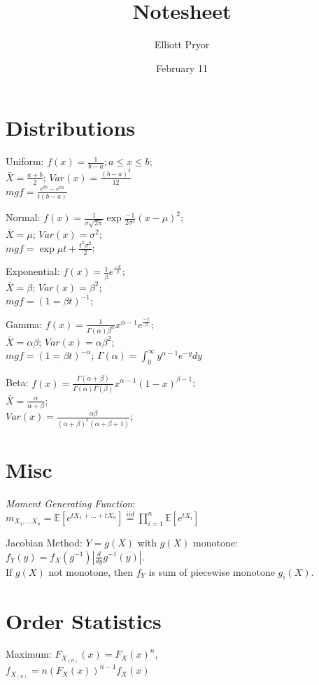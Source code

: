 \documentclass[10pt]{article}
\title{Notesheet}
\author{Elliott Pryor}
\date{February 11}
\begin{document}


\section{Distributions}
Uniform: $f(x) = \frac{1}{b - a}; a \leq x \leq b$;\\
$\bar{X} = \frac{a + b}{2}$;
$Var(x) = \frac{(b-a)^2}{12}$\\
$mgf = \frac{e^{tb} - e^{ta}}{t(b - a)}$

Normal: $f(x) = \frac{1}{\sigma \sqrt{2 \pi}} \exp{\frac{-1}{2\sigma^2}(x - \mu)^2}$;\\
$\bar{X} = \mu$;
$Var(x) = \sigma^2$;\\
$mgf = \exp{\mu t + \frac{t^2 \sigma^2}{2}}$;

Exponential: $f(x) = \frac{1}{\beta} e^{\frac{-x}{\beta}}$;\\
$\bar{X} = \beta$;
$Var(x) = \beta^2$;\\
$mgf = (1 = \beta t)^{-1}$;

Gamma: $f(x) = \frac{1}{\Gamma(\alpha)\beta^\alpha} x^{\alpha - 1} e^{\frac{-x}{\beta}}$;\\
$\bar{X} = \alpha \beta$;
$Var(x) = \alpha \beta^2$;\\
$mgf = (1 = \beta t)^{-\alpha}$;
$\Gamma(\alpha) = \int_0^\infty y^{\alpha - 1}e^{-y}dy$

Beta: $f(x) = \frac{\Gamma(\alpha + \beta)}{\Gamma(\alpha) \Gamma(\beta)} x^{\alpha-1} (1 - x)^{\beta - 1}$;\\
$\bar{X} = \frac{\alpha}{\alpha + \beta}$;\\
$Var(x) = \frac{\alpha \beta}{(\alpha + \beta)^2(\alpha + \beta + 1)}$;


\section{Misc}
\emph{Moment Generating Function}:\\
$m_{X_1, \dots X_n} = \mathbb{E}[e^{tX_1 + \dots + tX_n}] \stackrel{iid}{=} \prod_{i=1}^n \mathbb{E}[e^{tX_i}]$

Jacobian Method: $Y = g(X)$ with $g(X)$ monotone:\\
$f_Y(y) = f_X(g^{-1}) \left| \frac{d}{dy} g^{-1}(y) \right|$.\\
If $g(X)$ not monotone, then $f_Y$ is sum of piecewise monotone $g_i(X)$.

\section{Order Statistics}
Maximum:
$F_{X_{(n)}}(x) = F_X(x) ^n$, \\ 
$f_{X_{(n)}} = n (F_X(x))^{n-1}f_X(x)$ 
\end{document}
